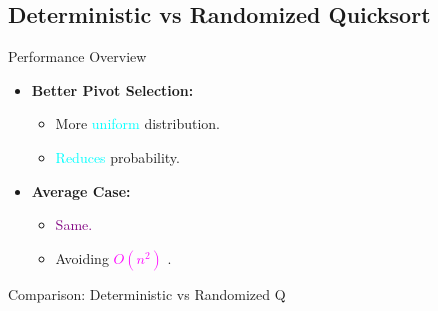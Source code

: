 \documentclass{beamer}
\begin{document}
\subsection{Deterministic vs Randomized Quicksort}
\begin{frame}{Performance Overview}
    \begin{itemize}
        \item \textbf{Better Pivot Selection:}
        \begin{itemize}
            \item More \textcolor{cyan}{uniform} distribution.
            \item \textcolor{cyan}{Reduces} probability.
        \end{itemize}
        \item \textbf{Average Case:}
        \begin{itemize}
            \item \textcolor{purple}{Same.}
            \item Avoiding \textcolor{magenta}{\( O(n^2) \)} .
        \end{itemize}
    \end{itemize}
    \begin{block}{Comparison: Deterministic vs Randomized Q}
    \begin{center}
    \small %
    \end{center}
\end{block}
\end{frame}
\end{document}
